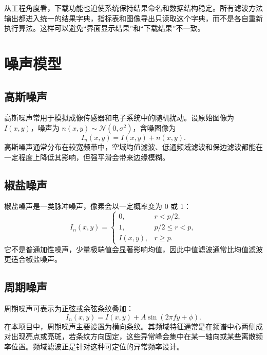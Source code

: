 \documentclass[UTF8,a4paper,12pt]{ctexart}
\begin{document}
从工程角度看，下载功能也迫使系统保持结果命名和数据结构稳定。所有滤波方法输出都进入统一的结果字典，指标表和图像导出只读取这个字典，而不是各自重新执行算法。这样可以避免“界面显示结果”和“下载结果”不一致。

\section{噪声模型}

\subsection{高斯噪声}

高斯噪声常用于模拟成像传感器和电子系统中的随机扰动。设原始图像为 $I(x,y)$，噪声为 $n(x,y)\sim \mathcal{N}(0,\sigma^2)$，含噪图像为
\begin{equation}
I_n(x,y)=I(x,y)+n(x,y).
\end{equation}
高斯噪声通常分布在较宽频带中，空域均值滤波、低通频域滤波和保边滤波都能在一定程度上降低其影响，但强平滑会带来边缘模糊。

\subsection{椒盐噪声}

椒盐噪声是一类脉冲噪声，像素会以一定概率变为 0 或 1：
\begin{equation}
I_n(x,y)=
\begin{cases}
0, & r < p/2,\\
1, & p/2 \le r < p,\\
I(x,y), & r \ge p.
\end{cases}
\end{equation}
它不是普通加性噪声，少量极端值会显著影响均值，因此中值滤波通常比均值滤波更适合椒盐噪声。

\subsection{周期噪声}

周期噪声可表示为正弦或余弦条纹叠加：
\begin{equation}
I_n(x,y)=I(x,y)+A\sin(2\pi f y+\phi).
\end{equation}
在本项目中，周期噪声主要设置为横向条纹。其频域特征通常是在频谱中心两侧成对出现亮点或亮斑，若条纹方向固定，这些异常峰会集中在某一轴向或某些离散频率位置。频域滤波正是针对这种可定位的异常频率设计。
\end{document}
